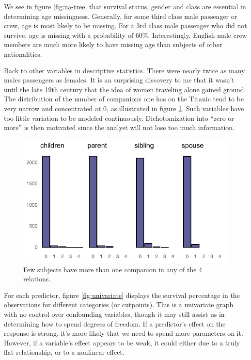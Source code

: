 \documentclass[]{interact}
\theoremstyle{plain}%
\theoremstyle{definition}
\theoremstyle{remark}
\begin{document}
We see in figure \ref{fig:na-tree} that survival status, gender and class are essential in determining age missingness. Generally, for some third class male passenger or crew, age is most likely to be missing. For a 3rd class male passenger who did not survive, age is missing with a probability of 60\%. Interestingly, English male crew members are much more likely to have missing age than subjects of other nationalities.

Back to other variables in descriptive statistics. There were nearly twice as many males passengers as females. It is an surprising discovery to me that it wasn't until the late 19th century that the idea of women traveling alone gained ground. The distribution of the number of companions one has on the Titanic tend to be very narrow and concentrated at 0, as illustrated in figure \ref{fig:skew-rel}. Such variables have too little variation to be modeled continuously. Dichotomization into ``zero or more'' is then motivated since the analyst will not lose too much information.

\begin{figure}[h]

{\centering \includegraphics{titanic-survival_files/figure-latex/skew-rel-1} 

}

\caption{Few subjects have more than one companion in any of the 4 relations.}\label{fig:skew-rel}
\end{figure}



For each predictor, figure \ref{fig:univariate} displays the survival percentage in the observations for different categories (or cutpoints). This is a univariate graph with no control over confounding variables, though it may still assist us in determining how to spend degrees of freedom. If a predictor's effect on the response is strong, it's more likely that we need to spend more parameters on it. However, if a variable's effect appears to be weak, it could either due to a truly flat relationship, or to a nonlinear effect.
\end{document}
